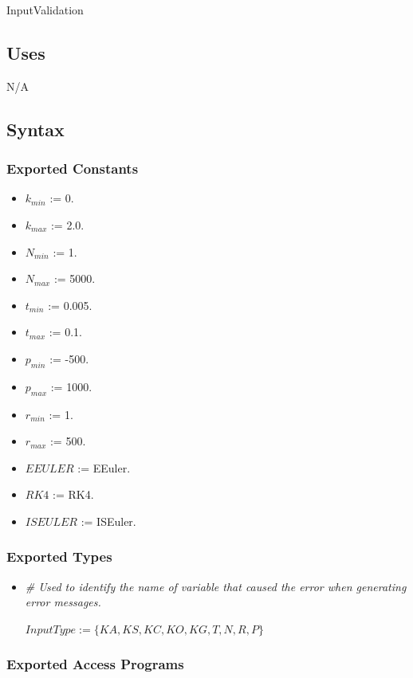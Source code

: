 \documentclass[12pt, titlepage]{article}
\begin{document}
InputValidation

\subsection{Uses}

N/A

\subsection{Syntax}

\subsubsection{Exported Constants}

\begin{itemize}
\item $k_{min}$ := 0.
\item $k_{max}$ := 2.0.
\item $N_{min}$ := 1.
\item $N_{max}$ := 5000.
\item $t_{min}$ := 0.005.
\item $t_{max}$ := 0.1.
\item $p_{min}$ := -500.
\item $p_{max}$ := 1000.
\item $r_{min}$ := 1.
\item $r_{max}$ := 500.
\item $EEULER$ := EEuler.
\item $RK4$ := RK4.
\item $ISEULER$ := ISEuler.
\end{itemize}

\subsubsection{Exported Types}

\begin{itemize}
\item \textit{\# Used to identify the name of variable that caused the error when generating error messages.}

$\mathit{InputType} := \{KA, KS, KC, KO, KG, T, N, R, P\}$
\end{itemize}

\subsubsection{Exported Access Programs}
\end{document}
